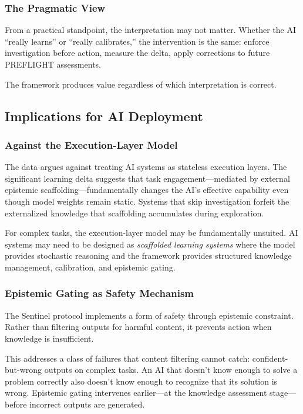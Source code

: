 \subsubsection{The Pragmatic View}

From a practical standpoint, the interpretation may not matter. Whether the AI ``really learns'' or ``really calibrates,'' the intervention is the same: enforce investigation before action, measure the delta, apply corrections to future PREFLIGHT assessments.

The framework produces value regardless of which interpretation is correct.

\subsection{Implications for AI Deployment}

\subsubsection{Against the Execution-Layer Model}

The data argues against treating AI systems as stateless execution layers. The significant learning delta suggests that task engagement---mediated by external epistemic scaffolding---fundamentally changes the AI's effective capability even though model weights remain static. Systems that skip investigation forfeit the externalized knowledge that scaffolding accumulates during exploration.

For complex tasks, the execution-layer model may be fundamentally unsuited. AI systems may need to be designed as \emph{scaffolded learning systems} where the model provides stochastic reasoning and the framework provides structured knowledge management, calibration, and epistemic gating.

\subsubsection{Epistemic Gating as Safety Mechanism}

The Sentinel protocol implements a form of safety through epistemic constraint. Rather than filtering outputs for harmful content, it prevents action when knowledge is insufficient.

This addresses a class of failures that content filtering cannot catch: confident-but-wrong outputs on complex tasks. An AI that doesn't know enough to solve a problem correctly also doesn't know enough to recognize that its solution is wrong. Epistemic gating intervenes earlier---at the knowledge assessment stage---before incorrect outputs are generated.

